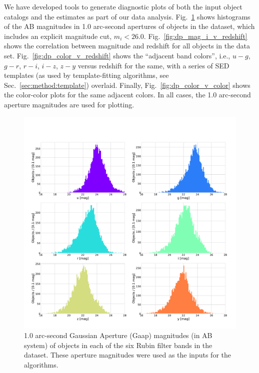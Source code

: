 We have developed tools to generate diagnostic plots of both the input object catalogs and the \photoz estimates as part of our data analysis.
Fig.~\ref{fig:dp_mags} shows histograms of the AB magnitudes in 1.0 arc-second apertures of objects in the  dataset, which includes an explicit magnitude cut, $m_{i} < 26.0$.
Fig.~\ref{fig:dp_mag_i_v_redshift} shows the correlation between magnitude and redshift for all objects in the  data set.  
Fig.~\ref{fig:dp_color_v_redshift} shows the ``adjacent band colors'', i.e., $u-g$, $g-r$, $r-i$, $i-z$, $z-y$ versus redshift for the same, with a series of SED templates (as used by template-fitting algorithms, see Sec.~\ref{sec:method:template}) overlaid.  
Finally, Fig.~\ref{fig:dp_color_v_color} shows the color-color plots for the same adjacent colors.  In all cases, the 1.0 arc-second aperture magnitudes are used for plotting.

\begin{figure}
    \centering
    \includegraphics[width=\linewidth]{figures/mags.pdf}
    \caption{1.0 arc-second Gaussian Aperture (Gaap) magnitudes (in AB system) of objects in each of the six Rubin filter bands in the  dataset.  These aperture magnitudes were used as the inputs for the \photoz algorithms.}
    \label{fig:dp_mags}
\end{figure}

